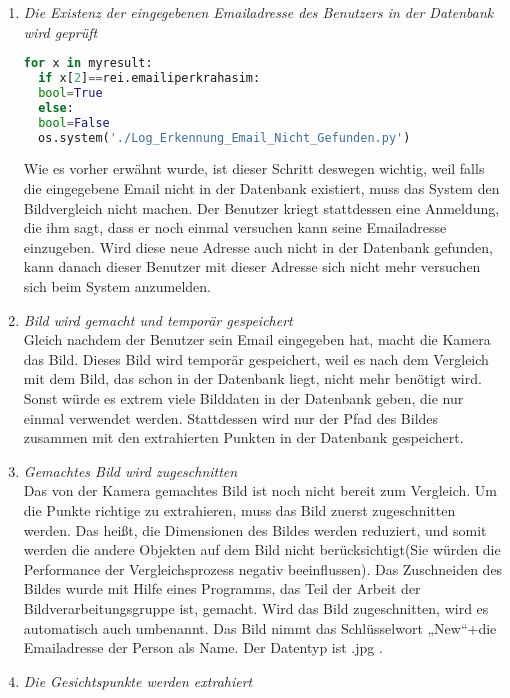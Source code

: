 \begin{enumerate}
	\item \textit{Die Existenz der eingegebenen Emailadresse des Benutzers in der Datenbank wird geprüft} \\

  \begin{lstlisting}[caption={{\"U}berpr{\"u}fung der Existenz der Emailadresse}, label={fig:kot}, language=Python]
  for x in myresult:
  if x[2]==rei.emailiperkrahasim:
  bool=True
  else:
  bool=False
  os.system('./Log_Erkennung_Email_Nicht_Gefunden.py')
\end{lstlisting}

Wie es vorher erwähnt wurde, ist dieser Schritt deswegen wichtig, weil falls die eingegebene Email nicht in der Datenbank existiert, muss das System den Bildvergleich nicht machen. Der Benutzer kriegt stattdessen eine Anmeldung, die ihm sagt, dass er noch einmal versuchen kann seine Emailadresse einzugeben. Wird diese neue Adresse auch nicht in der Datenbank gefunden, kann danach dieser Benutzer mit dieser Adresse sich nicht mehr versuchen sich beim System anzumelden. 
\item \textit{Bild wird gemacht und tempor{\"a}r gespeichert} \\

Gleich nachdem der Benutzer sein Email eingegeben hat, macht die Kamera das Bild. Dieses Bild wird tempor{\"a}r gespeichert, weil es nach dem Vergleich mit dem Bild, das schon in der Datenbank liegt, nicht mehr benötigt wird. Sonst w{\"u}rde es extrem viele Bilddaten in der Datenbank geben, die nur einmal verwendet werden. Stattdessen wird nur der Pfad des Bildes zusammen mit den extrahierten Punkten in der Datenbank gespeichert.
	\item \textit{Gemachtes Bild wird zugeschnitten} \\
	
Das von der Kamera gemachtes Bild ist noch nicht bereit zum Vergleich. Um die Punkte richtige zu extrahieren, muss das Bild zuerst zugeschnitten werden. Das heißt, die Dimensionen des Bildes werden reduziert, und somit werden die andere Objekten auf dem Bild nicht berücksichtigt(Sie würden die Performance der Vergleichsprozess negativ beeinflussen). Das Zuschneiden des Bildes wurde mit Hilfe eines Programms, das Teil der Arbeit der Bildverarbeitungsgruppe ist, gemacht. Wird das Bild zugeschnitten, wird es automatisch auch umbenannt. Das Bild nimmt das Schlüsselwort „New“+die Emailadresse der Person als Name. Der Datentyp ist .jpg .
	\item \textit{Die Gesichtspunkte werden extrahiert} \\
	

\end{enumerate}
